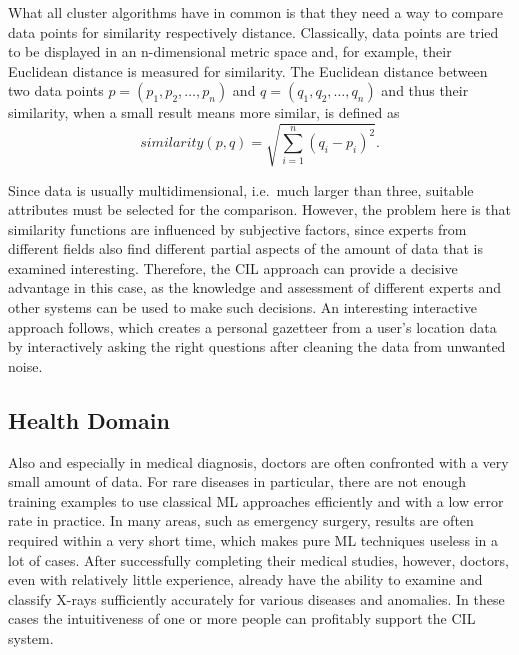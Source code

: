 \documentclass[conference]{IEEEtran}
\begin{document}
What all cluster algorithms have in common is that they need a way to compare data points for similarity respectively distance.
Classically, data points are tried to be displayed in an n-dimensional metric space and, for example, their Euclidean distance is measured for similarity.
The Euclidean distance between two data points $p = (p_1, p_2, \dots, p_n)$ and $q = (q_1, q_2, \dots, q_n)$ and thus their
similarity, when a small result means more similar, is defined as
\begin{equation*}
    similarity(p, q) = \sqrt{\sum_{i=1}^{n} (q_i - p_i)^{2}}.
\end{equation*}

Since data is usually multidimensional, i.e.\ much larger than three, suitable attributes must be selected for the comparison. 
However, the problem here is that similarity functions are influenced by subjective factors, since experts from different 
fields also find different partial aspects of the amount of data that is examined interesting.
Therefore, the CIL approach can provide a decisive advantage in this case, as the knowledge and assessment of 
different experts and other systems can be used to make such decisions.
An interesting interactive approach follows\cite{DJ:frankowski}, which creates a personal gazetteer from a user's location data 
by interactively asking the right questions after cleaning the data from unwanted noise.

\subsection{Health Domain}
Also and especially in medical diagnosis, doctors are often confronted with a very small amount of data.
For rare diseases in particular, there are not enough training examples to use classical ML approaches efficiently and with a low error rate in practice.
In many areas, such as emergency surgery, results are often required within a very short time, which makes pure ML techniques useless in a lot of cases.
After successfully completing their medical studies, however, doctors, even with relatively little experience, already have the ability to examine and classify X-rays sufficiently accurately for various diseases and anomalies.
In these cases the intuitiveness of one or more people can profitably support the CIL system.
\end{document}
